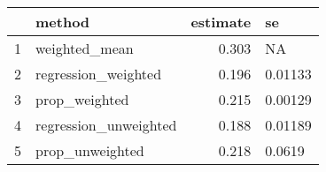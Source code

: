 \begin{table}[ht]
\centering
\begin{tabular}{rlrl}
  \hline
 & method & estimate & se \\ 
  \hline
1 & weighted\_mean & 0.303 & NA \\ 
  2 & regression\_weighted & 0.196 & 0.01133 \\ 
  3 & prop\_weighted & 0.215 & 0.00129 \\ 
  4 & regression\_unweighted & 0.188 & 0.01189 \\ 
  5 & prop\_unweighted & 0.218 & 0.0619 \\ 
   \hline
\end{tabular}
\end{table}
